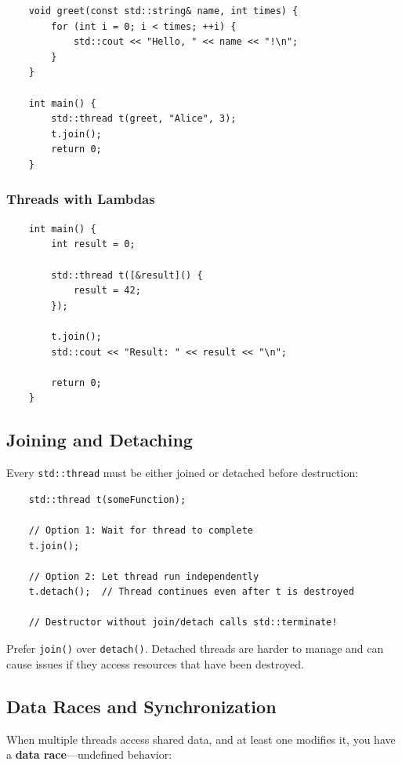 \begin{lstlisting}
	void greet(const std::string& name, int times) {
		for (int i = 0; i < times; ++i) {
			std::cout << "Hello, " << name << "!\n";
		}
	}
	
	int main() {
		std::thread t(greet, "Alice", 3);
		t.join();
		return 0;
	}
\end{lstlisting}

\subsubsection{Threads with Lambdas}

\begin{lstlisting}
	int main() {
		int result = 0;
		
		std::thread t([&result]() {
			result = 42;
		});
		
		t.join();
		std::cout << "Result: " << result << "\n";
		
		return 0;
	}
\end{lstlisting}

\subsection{Joining and Detaching}

Every \texttt{std::thread} must be either joined or detached before destruction:

\begin{lstlisting}
	std::thread t(someFunction);
	
	// Option 1: Wait for thread to complete
	t.join();
	
	// Option 2: Let thread run independently
	t.detach();  // Thread continues even after t is destroyed
	
	// Destructor without join/detach calls std::terminate!
\end{lstlisting}

\begin{remark}
	Prefer \texttt{join()} over \texttt{detach()}. Detached threads are harder to manage and can cause issues if they access resources that have been destroyed.
\end{remark}

\subsection{Data Races and Synchronization}

When multiple threads access shared data, and at least one modifies it, you have a \textbf{data race}—undefined behavior:

